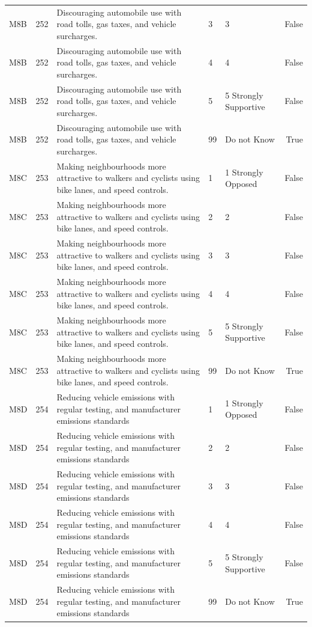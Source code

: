 \begin{tabular}{lrlllr}
M8B & 252 & Discouraging automobile use with road tolls, gas taxes, and vehicle surcharges. & 3 & 3 & False \\
M8B & 252 & Discouraging automobile use with road tolls, gas taxes, and vehicle surcharges. & 4 & 4 & False \\
M8B & 252 & Discouraging automobile use with road tolls, gas taxes, and vehicle surcharges. & 5 & 5 Strongly Supportive & False \\
M8B & 252 & Discouraging automobile use with road tolls, gas taxes, and vehicle surcharges. & 99 & Do not Know & True \\
M8C & 253 & Making neighbourhoods more attractive to walkers and cyclists using bike lanes, and speed controls. & 1 & 1 Strongly Opposed & False \\
M8C & 253 & Making neighbourhoods more attractive to walkers and cyclists using bike lanes, and speed controls. & 2 & 2 & False \\
M8C & 253 & Making neighbourhoods more attractive to walkers and cyclists using bike lanes, and speed controls. & 3 & 3 & False \\
M8C & 253 & Making neighbourhoods more attractive to walkers and cyclists using bike lanes, and speed controls. & 4 & 4 & False \\
M8C & 253 & Making neighbourhoods more attractive to walkers and cyclists using bike lanes, and speed controls. & 5 & 5 Strongly Supportive & False \\
M8C & 253 & Making neighbourhoods more attractive to walkers and cyclists using bike lanes, and speed controls. & 99 & Do not Know & True \\
M8D & 254 & Reducing vehicle emissions with regular testing, and manufacturer emissions standards & 1 & 1 Strongly Opposed & False \\
M8D & 254 & Reducing vehicle emissions with regular testing, and manufacturer emissions standards & 2 & 2 & False \\
M8D & 254 & Reducing vehicle emissions with regular testing, and manufacturer emissions standards & 3 & 3 & False \\
M8D & 254 & Reducing vehicle emissions with regular testing, and manufacturer emissions standards & 4 & 4 & False \\
M8D & 254 & Reducing vehicle emissions with regular testing, and manufacturer emissions standards & 5 & 5 Strongly Supportive & False \\
M8D & 254 & Reducing vehicle emissions with regular testing, and manufacturer emissions standards & 99 & Do not Know & True \\

\end{tabular}
